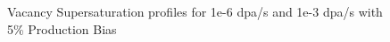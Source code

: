 \documentclass[a4paper]{article}
\begin{document}
      \begin{figure}[h!]  %
        \centering
        \qquad
        \caption{Vacancy Supersaturation profiles for 1e-6 dpa/s and 1e-3 dpa/s with 5\% Production Bias}
        \label{figure:11}
      \end{figure}
\end{document}
